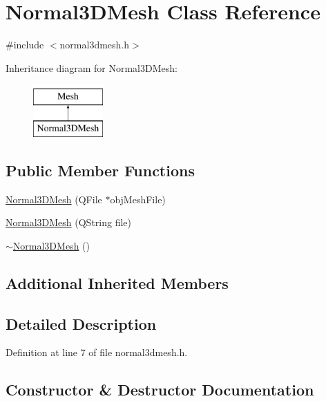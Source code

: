 \hypertarget{class_normal3_d_mesh}{}\section{Normal3\+D\+Mesh Class Reference}
\label{class_normal3_d_mesh}


{\ttfamily \#include $<$normal3dmesh.\+h$>$}

Inheritance diagram for Normal3\+D\+Mesh\+:\begin{figure}[H]
\begin{center}
\leavevmode
\includegraphics[height=2.000000cm]{class_normal3_d_mesh}
\end{center}
\end{figure}
\subsection*{Public Member Functions}
\begin{DoxyCompactItemize}
\item 
\hyperlink{class_normal3_d_mesh_a4eb05602fa8aa89dbfa135dd8b938055}{Normal3\+D\+Mesh} (Q\+File $\ast$obj\+Mesh\+File)
\item 
\hyperlink{class_normal3_d_mesh_aa596728d13cb7785a32fd18eb166a32c}{Normal3\+D\+Mesh} (Q\+String file)
\item 
\hyperlink{class_normal3_d_mesh_aa9d9e8bae673dca2b4b72666fdf6f4b4}{$\sim$\+Normal3\+D\+Mesh} ()
\end{DoxyCompactItemize}
\subsection*{Additional Inherited Members}


\subsection{Detailed Description}


Definition at line 7 of file normal3dmesh.\+h.



\subsection{Constructor \& Destructor Documentation}
\hypertarget{class_normal3_d_mesh_a4eb05602fa8aa89dbfa135dd8b938055}{}
